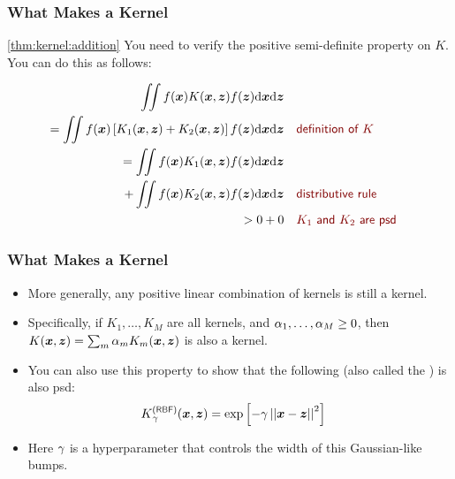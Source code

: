 \documentclass[trans]{beamer}
\begin{document}
\begin{frame}
  \frametitle{What Makes a Kernel}
\begin{myproof}{\ref{thm:kernel:addition}}
You need to verify the positive semi-definite property on $K$.  You
can do this as follows:
%
\begin{footnotesize}
\begin{align}
\int\!\!\!\int f(\vx) K(\vx,\vz) f(\vz) \ud \vx \ud \vz \\
= \int\!\!\!\int f(\vx) \left[ K_1(\vx,\vz) + K_2(\vx,\vz) \right] f(\vz) \ud \vx \ud \vz 
   \becauseof{definition of $K$}\\
= \int\!\!\!\int f(\vx) K_1(\vx,\vz) f(\vz) \ud \vx \ud \vz \nonumber\\
\quad + \int\!\!\!\int f(\vx) K_2(\vx,\vz) f(\vz) \ud \vx \ud \vz 
  \becauseof{distributive rule}\\
> 0 + 0
   \becauseof{$K_1$ and $K_2$ are psd}
\end{align}
\end{footnotesize}
\end{myproof}
\end{frame}

\begin{frame}
  \frametitle{What Makes a Kernel}
\begin{itemize}
\item 
More generally, any positive linear combination of kernels is still a
kernel.
\item  Specifically, if $K_1, \dots, K_M$ are all kernels, and
$\alpha_1, \dots, \alpha_M \geq 0$, then $K({\boldsymbol{x}},{\boldsymbol{z}}) = \sum_m \alpha_m
K_m({\boldsymbol{x}},{\boldsymbol{z}})$ is also a kernel.
\item 
You can also use this property to show that the following
 (also called the ) is
also psd:
%
\begin{align}
K\xth{RBF}_\ga(\vx,\vz) &= \exp\left[ - \ga \norm{\vx-\vz}^2 \right]
\end{align}
%
\item
Here $\gamma$ is a hyperparameter that controls the width of this
Gaussian-like bumps. 
\end{itemize}
\end{frame}
\end{document}
